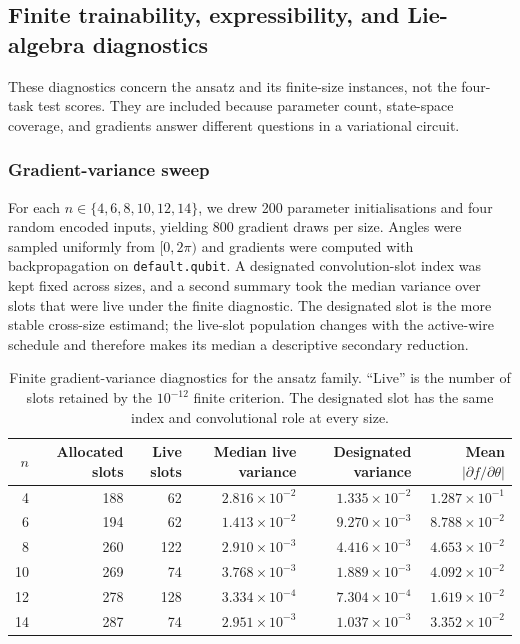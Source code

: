 \documentclass[conference]{IEEEtran}
\begin{document}
\subsection{Finite trainability, expressibility, and Lie-algebra diagnostics}
\label{sec:diagnostics}
These diagnostics concern the ansatz and its finite-size instances, not the
four-task test scores. They are included because parameter count, state-space
coverage, and gradients answer different questions in a variational circuit.

\subsubsection{Gradient-variance sweep}
For each $n\in\{4,6,8,10,12,14\}$, we drew 200 parameter initialisations and
four random encoded inputs, yielding 800 gradient draws per size. Angles were
sampled uniformly from $[0,2\pi)$ and gradients were computed with backpropagation
on \texttt{default.qubit}. A designated convolution-slot index was kept fixed
across sizes, and a second summary took the median variance over slots that
were live under the finite diagnostic. The designated slot is the more stable
cross-size estimand; the live-slot population changes with the active-wire
schedule and therefore makes its median a descriptive secondary reduction.

\begin{table}[!t]
\caption{Finite gradient-variance diagnostics for the ansatz family. ``Live'' is the number of slots retained by the $10^{-12}$ finite criterion. The designated slot has the same index and convolutional role at every size.}
\label{tab:gradient}
\centering
\small
\begin{tabular}{@{}rrrrrr@{}}
\toprule
\textbf{$n$} & \textbf{Allocated slots} & \textbf{Live slots} & \textbf{Median live variance} & \textbf{Designated variance} & \textbf{Mean $|\partial f/\partial\theta|$} \\
\midrule
4 & 188 & 62 & $2.816\times10^{-2}$ & $1.335\times10^{-2}$ & $1.287\times10^{-1}$ \\
6 & 194 & 62 & $1.413\times10^{-2}$ & $9.270\times10^{-3}$ & $8.788\times10^{-2}$ \\
8 & 260 & 122 & $2.910\times10^{-3}$ & $4.416\times10^{-3}$ & $4.653\times10^{-2}$ \\
10 & 269 & 74 & $3.768\times10^{-3}$ & $1.889\times10^{-3}$ & $4.092\times10^{-2}$ \\
12 & 278 & 128 & $3.334\times10^{-4}$ & $7.304\times10^{-4}$ & $1.619\times10^{-2}$ \\
14 & 287 & 74 & $2.951\times10^{-3}$ & $1.037\times10^{-3}$ & $3.352\times10^{-2}$ \\
\bottomrule
\end{tabular}
\end{table}
\end{document}
